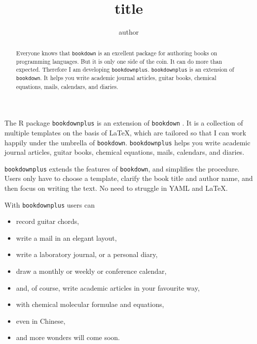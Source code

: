 \documentclass[bgd, online, hvmath]{style/copernicus-discussions}
\begin{document}
\sloppy

\title{title}

\author{author}






\maketitle

\begin{abstract}
Everyone knows that \texttt{bookdown} is an excellent package for authoring books on programming languages. But it is only one side of the coin. It can do more than expected. Therefore I am developing \texttt{bookdownplus}. \texttt{bookdownplus} is an extension of \texttt{bookdown}. It helps you write academic journal articles, guitar books, chemical equations, mails, calendars, and diaries.
\end{abstract}

\introduction

The R package \texttt{bookdownplus} \citep{R-bookdownplus} is an extension of \texttt{bookdown} \citep{R-bookdown}. It is a collection of
multiple templates on the basis of LaTeX, which are tailored so that I can work happily under the umbrella of \texttt{bookdown}. \texttt{bookdownplus} helps you write academic journal articles, guitar books, chemical equations, mails, calendars, and diaries.

\texttt{bookdownplus} extends the features of \texttt{bookdown}, and simplifies the procedure. Users only have to choose a template, clarify the book title and author name, and then focus on writing the text. No need to struggle in YAML and LaTeX.

With \texttt{bookdownplus} users can

\begin{itemize}
\item
  record guitar chords,
\item
  write a mail in an elegant layout,
\item
  write a laboratory journal, or a personal diary,
\item
  draw a monthly or weekly or conference calendar,
\item
  and, of course, write academic articles in your favourite way,
\item
  with chemical molecular formulae and equations,
\item
  even in Chinese,
\item
  and more wonders will come soon.
\end{itemize}
\end{document}

